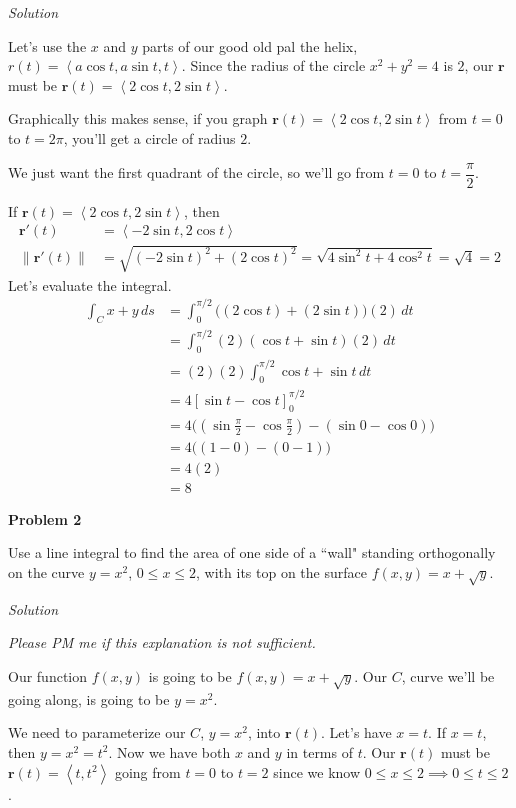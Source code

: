 \documentclass{article}
\newcommand{\lrp}[1]{\left( #1 \right)}
\newcommand{\lra}[1]{\left\langle #1 \right\rangle}
\newcommand{\lrb}[1]{\left[ #1 \right]}
\newcommand{\norm}[1]{\left\lVert #1 \right\rVert}
\renewcommand{\r}[0]{\mathbf{r}}
\newcommand{\Solution}{\textit{Solution}}
\begin{document}
\Solution

Let's use the $x$ and $y$ parts of our good old pal the helix, $r(t)=\lra{a\cos t, a \sin t, t}$. Since the radius of the circle $x^2+y^2=4$ is $2$, our $\r$ must be $\r(t)=\lra{2\cos t, 2\sin t}$. 

Graphically this makes sense, if you graph $\r(t)=\lra{2\cos t, 2\sin t}$ from $t=0$ to $t=2\pi$, you'll get a circle of radius $2$.

We just want the first quadrant of the circle, so we'll go from $t=0$ to $t=\dfrac{\pi}{2}$.

If $\r(t)=\lra{2\cos t,2\sin t}$, then
\begin{align*}
    \r'(t)&=\lra{-2\sin t, 2\cos t}\\
    \norm{\r'(t)}&=\sqrt{(-2\sin t)^2 +(2\cos t)^2}=\sqrt{4\sin^2 t + 4\cos ^2 t}=\sqrt{4}=2
\end{align*}
Let's evaluate the integral.
\begin{align*}
    \int_C x+y\,ds&=\int_0^{\pi/2} \bigg((2\cos t)+\lrp{2\sin t}\bigg)\lrp{2}\,dt\\
    &=\int_0^{\pi/2}(2)(\cos t + \sin t)(2)\,dt\\
    &=(2)(2)\int_0^{\pi/2}\cos t + \sin t \,dt\tag{we can move constants outside}\\
    &=4\lrb{\sin t - \cos t}_0^{\pi / 2}\\
    &=4\Bigg(\lrp{\sin \frac{\pi}{2}-\cos \frac{\pi}{2}}-\lrp{\sin 0 - \cos 0}\Bigg)\\
    &=4\bigg(\lrp{1-0}-\lrp{0-1}\bigg)\\
    &=4(2)\\
    &=\boxed{8}
\end{align*}
{}\textbf{Problem 2}

Use a line integral to find the area of one side of a ``wall" standing orthogonally on the
curve $y=x^2$, $0\leq x\leq 2$, with its top on the surface $f(x,y)=x+\sqrt{y}$.

\Solution

\textit{Please PM me if this explanation is not sufficient.}

Our function $f(x,y)$ is going to be $f(x,y)=x+\sqrt{y}$. Our $C$, curve we'll be going along, is going to be $y=x^2$.

We need to parameterize our $C$, $y=x^2$, into $\r(t)$. Let's have $x=t$. If $x=t$, then $y=x^2=t^2$. Now we have both $x$ and $y$ in terms of $t$. Our $\r(t)$ must be $\r(t)=\lra{t,t^2}$ going from $t=0$ to $t=2$ since we know $0\leq x\leq 2\implies 0\leq t \leq 2
$.
\end{document}
